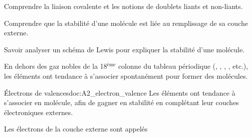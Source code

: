 \teteSndMole



\begin{objectifs}
  \item Comprendre la liaison covalente et les notions de doublets liants et non-liants.
  \item Comprendre que la stabilité d'une molécule est liée au remplissage de sa couche externe.
  \item Savoir analyser un schéma de Lewis pour expliquer la stabilité d'une molécule.
\end{objectifs}

\begin{contexte}
  En dehors des gaz nobles de la 18$^\text{ème}$ colonne du tableau périodique (, , , , etc.), les éléments ont tendance à s'associer spontanément pour former des molécules. 
  
\end{contexte}



\begin{doc}{Électrons de valences}{doc:A2_electron_valence}
  Les éléments ont tendance à s'associer en molécule, afin de gagner en stabilité en complétant leur couches électroniques externes.
  
  \begin{importants}  
    Les électrons de la couche externe sont appelés 
  \end{importants}  
\end{doc}
  
